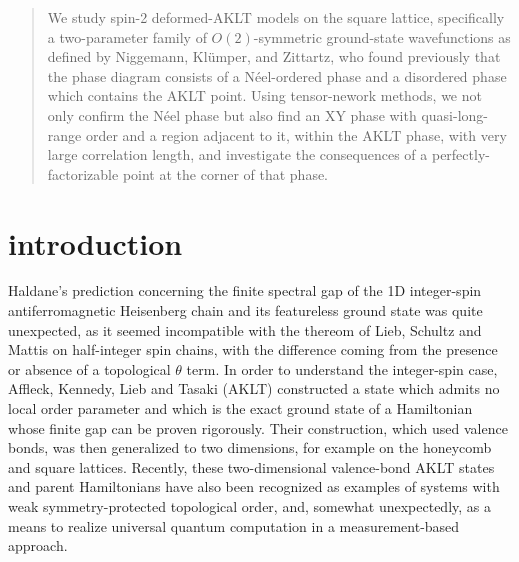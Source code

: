 \documentclass[aps,prb,letterpaper,superscriptaddress,twocolumn,showpacs,floatfix,10pt]{revtex4-1}
\begin{document}
\author{Nicholas Pomata}

 
\author{Ching-Yu Huang}


\author{Tzu-Chieh Wei}

\vfill
\begin{abstract}
We study spin-2 deformed-AKLT models on the square lattice, 
specifically a two-parameter family
of $O(2)$-symmetric ground-state wavefunctions as defined by
Niggemann, Kl\"umper, and Zittartz,
who found previously that the phase diagram consists of a N\'eel-ordered phase
and a disordered phase which contains the AKLT point. Using
tensor-nework methods, we not only confirm the N\'eel phase but also find an
XY phase with quasi-long-range order and a region adjacent to it, within
the AKLT phase, with very large correlation length, and investigate the
consequences of a perfectly-factorizable point at the corner of that
phase.
\end{abstract}



\maketitle



\section{ introduction}
\label{sec:intro}
Haldane's prediction concerning the finite spectral gap of the 1D
integer-spin antiferromagnetic Heisenberg chain and its featureless ground state
was quite unexpected\cite{Haldane1D}, as it seemed incompatible with the
thereom of Lieb, Schultz and Mattis \cite{LSM} on half-integer spin chains, with
the difference coming from the presence or absence of
a topological $\theta$ term. In order to understand the integer-spin case,
Affleck, Kennedy, Lieb and Tasaki (AKLT) constructed a state which admits no
local order parameter and which is the exact ground state of a
Hamiltonian whose finite gap can be proven rigorously.\cite{AKLT_PRL,AKLT_1988}
Their construction, which used valence bonds, was then generalized to two
dimensions, for example on the honeycomb and square lattices.
Recently, these two-dimensional valence-bond AKLT states and parent
Hamiltonians have also been recognized as examples of systems with
weak symmetry-protected topological order\cite{CZX,AKLTstrange,SREstrange},
and, somewhat unexpectedly, as a means to realize universal quantum
computation in a measurement-based approach.\cite{AKLT_QC_honeycomb,AKLT_QC_square}
\end{document}
